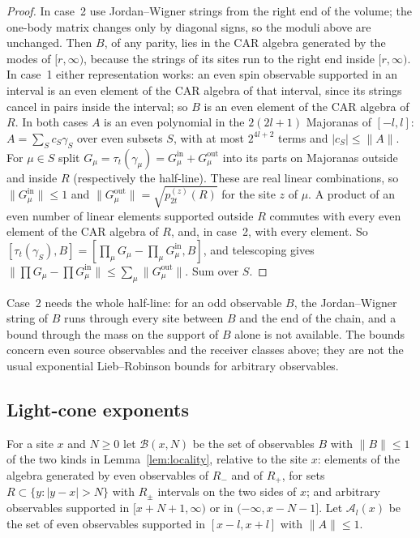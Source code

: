 \begin{proof}
In case~2 use Jordan--Wigner strings from the right end of the volume; the one-body matrix changes only by diagonal signs, so the moduli above are unchanged. Then $B$, of any parity, lies in the CAR algebra generated by the modes of $[r,\infty)$, because the strings of its sites run to the right end inside $[r,\infty)$. In case~1 either representation works: an even spin observable supported in an interval is an even element of the CAR algebra of that interval, since its strings cancel in pairs inside the interval; so $B$ is an even element of the CAR algebra of $R$. In both cases $A$ is an even polynomial in the $2(2l+1)$ Majoranas of $[-l,l]$: $A=\sum_Sc_S\gamma_S$ over even subsets $S$, with at most $2^{4l+2}$ terms and $|c_S|\le\|A\|$. For $\mu\in S$ split $G_\mu=\tau_t(\gamma_\mu)=G^{\mathrm{in}}_\mu+G^{\mathrm{out}}_\mu$ into its parts on Majoranas outside and inside $R$ (respectively the half-line). These are real linear combinations, so $\|G^{\mathrm{in}}_\mu\|\le1$ and $\|G^{\mathrm{out}}_\mu\|=\sqrt{p^{(z)}_{2t}(R)}$ for the site $z$ of $\mu$. A product of an even number of linear elements supported outside $R$ commutes with every even element of the CAR algebra of $R$, and, in case~2, with every element. So $[\tau_t(\gamma_S),B]=[\prod_\mu G_\mu-\prod_\mu G^{\mathrm{in}}_\mu,B]$, and telescoping gives $\|\prod G_\mu-\prod G^{\mathrm{in}}_\mu\|\le\sum_\mu\|G^{\mathrm{out}}_\mu\|$. Sum over $S$.
\end{proof}

Case~2 needs the whole half-line: for an odd observable $B$, the Jordan--Wigner string of $B$ runs through every site between $B$ and the end of the chain, and a bound through the mass on the support of $B$ alone is not available. The bounds concern even source observables and the receiver classes above; they are not the usual exponential Lieb--Robinson bounds for arbitrary observables.

\subsection{Light-cone exponents}

For a site $x$ and $N\ge0$ let $\mathcal B(x,N)$ be the set of observables $B$ with $\|B\|\le1$ of the two kinds in Lemma~\ref{lem:locality}, relative to the site $x$: elements of the algebra generated by even observables of $R_-$ and of $R_+$, for sets $R\subset\{y:|y-x|>N\}$ with $R_\pm$ intervals on the two sides of $x$; and arbitrary observables supported in $[x+N+1,\infty)$ or in $(-\infty,x-N-1]$. Let $\mathcal A_l(x)$ be the set of even observables supported in $[x-l,x+l]$ with $\|A\|\le1$.

